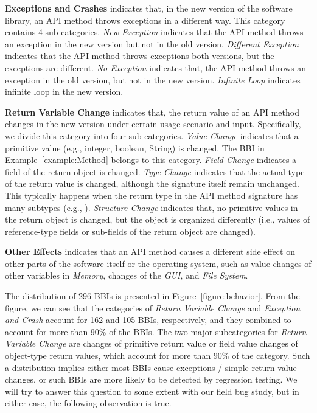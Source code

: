 \textbf{Exceptions and Crashes} indicates that, in the new version of the software library, an API method throws exceptions in a different way. This category contains 4 sub-categories. \textit{New Exception} indicates that the API method throws an exception in the new version but not in the old version. \textit{Different Exception} indicates that the API method throws exceptions both versions, but the exceptions are different. \textit{No Exception} indicates that, the API method throws an exception in the old version, but not in the new version. \textit{Infinite Loop} indicates infinite loop in the new version. 

\textbf{Return Variable Change} indicates that, the return value of an API method changes in the new version under certain usage scenario and input. Specifically, we divide this category into four sub-categories. \textit{Value Change} indicates that a primitive value (e.g., integer, boolean, String) is changed. The BBI in Example~\ref{example:Method} belongs to this category. \textit{Field Change} indicates a field of the return object is changed. \textit{Type Change} indicates that the actual type of the return value is changed, although the signature itself remain unchanged. This typically happens when the return type in the API method signature has many subtypes (e.g., ). \textit{Structure Change} indicates that, no primitive values in the return object is changed, but the object is organized differently (i.e., values of reference-type fields or sub-fields of the return object are changed). 

\textbf{Other Effects} indicates that an API method causes a different side effect on other parts of the software itself or the operating system, such as value changes of other variables in \textit{Memory}, changes of the \textit{GUI}, and \textit{File System}. 

The distribution of 296 BBIs is presented in Figure~\ref{figure:behavior}. From the figure, we can see that the categories of \textit{Return Variable Change} and \textit{Exception and Crash} account for 162 and 105 BBIs, respectively, and they combined to account for more than 90\% of the BBIs. The two major subcategories for \textit{Return Variable Change} are changes of primitive return value or field value changes of object-type return values, which account for more than 90\% of the category. Such a distribution implies either most BBIs cause exceptions / simple return value changes, or such BBIs are more likely to be detected by regression testing. We will try to answer this question to some extent with our field bug study, but in either case, the following observation is true. 


